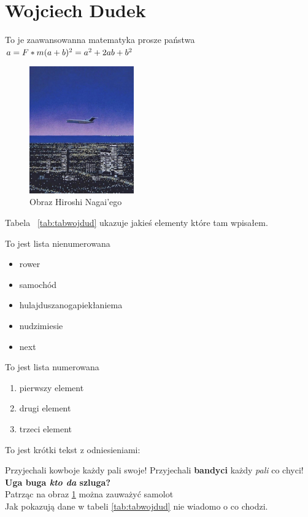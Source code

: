 \section{Wojciech Dudek}
\label{sec:wojdud}

To je zaawansowanna matematyka prosze państwa
\begin{math}
\\a = F*m
\\(a+b)^2 = a^2 + 2ab + b^2
\end{math}

\begin{figure}[htbp]
    \centering   
    \includegraphics[width=0.4\textwidth]{pictures/fotalatex.jpg}
    \caption{Obraz Hiroshi Nagai'ego}
    \label{fig:animuobrazek}
\end{figure}

Tabela ~\ref{tab:tabwojdud} ukazuje jakieś elementy które tam wpisałem.



To jest lista nienumerowana
\begin{itemize}
    \item rower
    \item samochód
    \item hulajduszanogapiekłaniema
    \item nudzimiesie
    \item next
\end{itemize}

To jest lista numerowana
\begin{enumerate}
    \item pierwszy element
    \item drugi element
    \item trzeci element
\end{enumerate}

To jest krótki tekst z odniesieniami:

Przyjechali kowboje każdy pali swoje!
Przyjechali \textbf{bandyci} każdy \textit{pali} co chyci!
\textbf{Uga buga \emph{kto da} szluga?}\\ 
Patrząc na obraz \ref{fig:animuobrazek} można zauważyć samolot\\
Jak pokazują dane w tabeli \ref{tab:tabwojdud} nie wiadomo o co chodzi.
